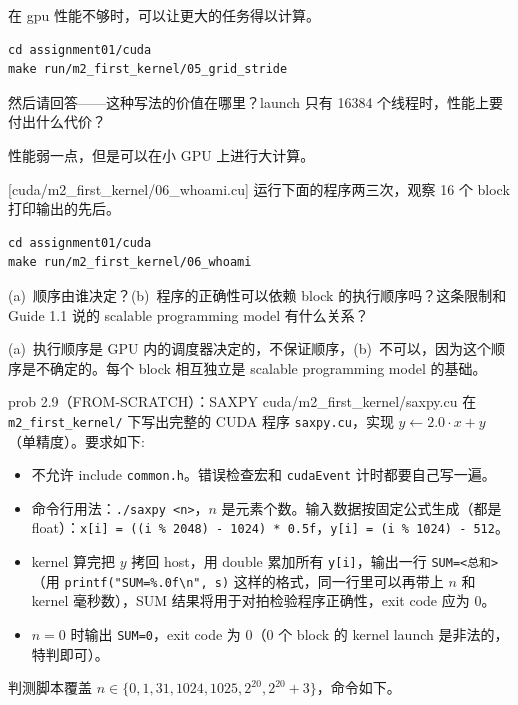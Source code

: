 \documentclass[11pt,a4paper,fontset=none]{ctexart}
\begin{document}
在 gpu 性能不够时，可以让更大的任务得以计算。

\begin{lstlisting}
cd assignment01/cuda
make run/m2_first_kernel/05_grid_stride
\end{lstlisting}

然后请回答——这种写法的价值在哪里？launch 只有 16384 个线程时，性能上要付出什么代价？

性能弱一点，但是可以在小 GPU 上进行大计算。

[cuda/m2\_first\_kernel/06\_whoami.cu]
运行下面的程序两三次，观察 16 个 block 打印输出的先后。

\begin{lstlisting}
cd assignment01/cuda
make run/m2_first_kernel/06_whoami
\end{lstlisting}

(a)~顺序由谁决定？(b)~程序的正确性可以依赖 block 的执行顺序吗？这条限制和 Guide 1.1 说的 scalable programming model 有什么关系？

(a)~执行顺序是 GPU 内的调度器决定的，不保证顺序，(b)~不可以，因为这个顺序是不确定的。每个 block 相互独立是 scalable programming model 的基础。

\begin{capstone}{prob 2.9（FROM-SCRATCH）：SAXPY \hfill {\footnotesize\ttfamily cuda/m2\_first\_kernel/saxpy.cu}}
  在 \texttt{m2\_first\_kernel/} 下写出完整的 CUDA 程序 \texttt{saxpy.cu}，实现 $y \leftarrow 2.0 \cdot x + y$（单精度）。要求如下:
  \begin{itemize}
    \item 不允许 include \texttt{common.h}。错误检查宏和 \texttt{cudaEvent} 计时都要自己写一遍。
    \item 命令行用法：\texttt{./saxpy <n>}，$n$ 是元素个数。输入数据按固定公式生成（都是 float）：\texttt{x[i] = ((i \% 2048) - 1024) * 0.5f}，\texttt{y[i] = (i \% 1024) - 512}。
    \item kernel 算完把 $y$ 拷回 host，用 double 累加所有 \texttt{y[i]}，输出一行 \texttt{SUM=<总和>}（用 \texttt{printf("SUM=\%.0f\textbackslash n", s)} 这样的格式，同一行里可以再带上 $n$ 和 kernel 毫秒数），SUM 结果将用于对拍检验程序正确性，exit code 应为 0。
    \item $n = 0$ 时输出 \texttt{SUM=0}，exit code 为 0（0 个 block 的 kernel launch 是非法的，特判即可）。
  \end{itemize}
\end{capstone}

判测脚本覆盖 $n \in \{0, 1, 31, 1024, 1025, 2^{20}, 2^{20}{+}3\}$，命令如下。
\end{document}
